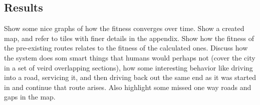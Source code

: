 \subsection{Results}
Show some nice graphs of how the fitness converges over time.
Show a created map, and refer to tiles with finer details in the appendix.
Show how the fitness of the pre-existing routes relates to the fitness of the calculated ones.
Discuss how the system does som smart things that humans would perhaps not (cover the city in a set of veird overlapping sections), how some interesting behavior like driving into a road, servicing it, and then driving back out the same end as it was started in and continue that route arises. Also highlight some missed one way roads and gaps in the map.


\cleardoublepage